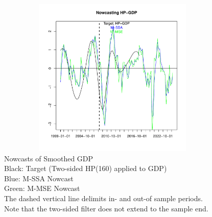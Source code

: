 \documentclass[11pt,a4paper]{article}
\begin{document}
\begin{figure}[htpb]
    \begin{center}
        \includegraphics[height=3in, width=4.5in]{./Figures/mssa_msse_now.pdf}
        \caption{Nowcasts of Smoothed GDP\\
        \indent Black: Target (Two-sided HP(160) applied to GDP) \\ 
        \indent Blue: M-SSA Nowcast\\
        \indent Green: M-MSE Nowcast\\
        \indent The dashed vertical line delimits in- and out-of sample periods.  \\
        Note that the two-sided filter does not extend to the sample end.
        \label{mssa_msse_now}}
    \end{center}
\end{figure}
\end{document}
